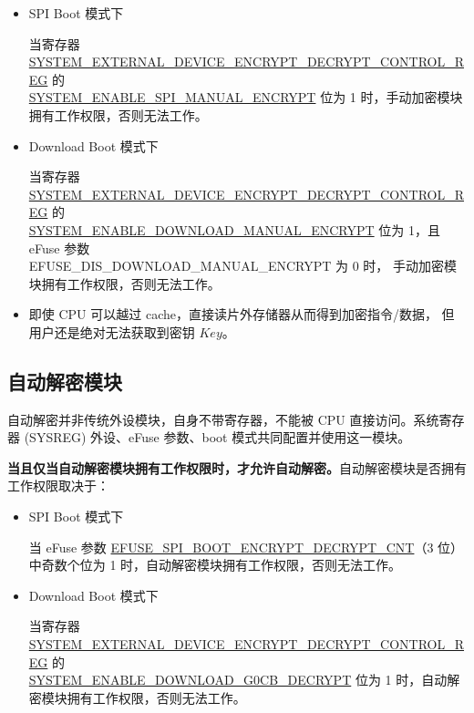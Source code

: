 \documentclass[main\_\_CN.tex]{subfiles}
\begin{document}
\begin{itemize}

    \item SPI Boot 模式下

    当寄存器 \hyperref[regdesc:SYSTEMEXTERNALDEVICEENCRYPTDECRYPTCONTROLREG]{SYSTEM\_EXTERNAL\_DEVICE\_ENCRYPT\_DECRYPT\_CONTROL\_REG} 的 \\ \hyperref[fielddesc:SYSTEMENABLESPIMANUALENCRYPT]{SYSTEM\_ENABLE\_SPI\_MANUAL\_ENCRYPT} 位为 1 时，手动加密模块拥有工作权限，否则无法工作。

    \item Download Boot 模式下

    当寄存器 \hyperref[regdesc:SYSTEMEXTERNALDEVICEENCRYPTDECRYPTCONTROLREG]{SYSTEM\_EXTERNAL\_DEVICE\_ENCRYPT\_DECRYPT\_CONTROL\_REG} 的\\ \hyperref[fielddesc:SYSTEMENABLEDOWNLOADMANUALENCRYPT]{SYSTEM\_ENABLE\_DOWNLOAD\_MANUAL\_ENCRYPT} 位为 1，且 eFuse 参数\\ EFUSE\_DIS\_DOWNLOAD\_MANUAL\_ENCRYPT 为 0 时，
    手动加密模块拥有工作权限，否则无法工作。

\end{itemize}

\begin{tiplisting}
\vspace{-2em}
\begin{itemize}
\item 即使 CPU 可以越过 cache，直接读片外存储器从而得到加密指令/数据，
但用户还是绝对无法获取到密钥 \begin{math}Key\end{math}。
\end{itemize}
\end{tiplisting}


\subsection{自动解密模块}

自动解密并非传统外设模块，自身不带寄存器，不能被 CPU 直接访问。系统寄存器 (SYSREG) 外设、eFuse 参数、boot 模式共同配置并使用这一模块。

\textbf{当且仅当自动解密模块拥有工作权限时，才允许自动解密。}自动解密模块是否拥有工作权限取决于：

\begin{itemize}

    \item SPI Boot 模式下

    当 eFuse 参数 \hyperref[fielddesc:EFUSESPIBOOTENCRYPTDECRYPTCNT]{EFUSE\_SPI\_BOOT\_ENCRYPT\_DECRYPT\_CNT}（3 位）中奇数个位为 1 时，自动解密模块拥有工作权限，否则无法工作。

    \item Download Boot 模式下

    当寄存器 \hyperref[regdesc:SYSTEMEXTERNALDEVICEENCRYPTDECRYPTCONTROLREG]{SYSTEM\_EXTERNAL\_DEVICE\_ENCRYPT\_DECRYPT\_CONTROL\_REG} 的 \\ \hyperref[fielddesc:SYSTEMENABLEDOWNLOADG0CBDECRYPT]{SYSTEM\_ENABLE\_DOWNLOAD\_G0CB\_DECRYPT} 位为 1 时，自动解密模块拥有工作权限，否则无法工作。

\end{itemize}
\end{document}
